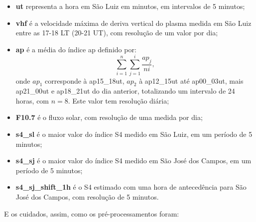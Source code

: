 \begin{itemize}
\item {\bf ut} representa a hora em São Luiz em minutos, em intervalos de 5 minutos;
\item {\bf vhf} é a velocidade máxima de deriva vertical do plasma medida em São Luiz entre as 17-18 LT (20-21 UT), com resolução de um valor por dia;
\item {\bf ap} é a média do índice ap definido por:
\begin{equation}\label{eq:ap}
\sum_{i=1}^{n}\sum_{j=1}^{i}\frac{ap_{j}}{ni}\mbox{,}~
\end{equation}
onde $ap_1$ corresponde à ap15\_18ut, $ap_2$ à ap12\_15ut até ap00\_03ut, mais ap21\_00ut e ap18\_21ut do dia anterior, totalizando um intervalo de 24 horas, com $n=8$. Este valor tem resolução diária;
\item {\bf F10.7} é o fluxo solar, com resolução de uma medida por dia;
\item {\bf s4\_sl} é o maior valor do índice S4 medido em São Luiz, em um período de 5 minutos;
\item {\bf s4\_sj} é o maior valor do índice S4 medido em São José dos Campos, em um período de 5 minutos;
\item {\bf s4\_sj\_shift\_1h} é o S4 estimado com uma hora de antecedência para São José dos Campos, com resolução de 5 minutos.
\end{itemize}

E os cuidados, assim, como os pré-processamentos foram:

